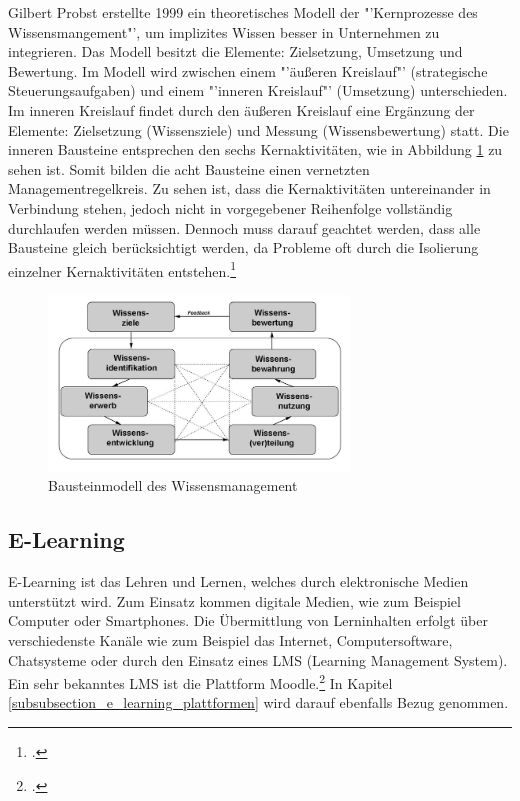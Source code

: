 Gilbert Probst erstellte 1999 ein theoretisches Modell der "'Kernprozesse des Wissensmangement"', um implizites 
Wissen besser in Unternehmen zu integrieren. Das Modell besitzt die Elemente: Zielsetzung, Umsetzung und 
Bewertung. Im Modell wird zwischen einem "'äußeren Kreislauf"' (strategische Steuerungsaufgaben) und einem 
"'inneren Kreislauf"' (Umsetzung) unterschieden. Im inneren Kreislauf findet durch den äußeren Kreislauf eine 
Ergänzung der Elemente: Zielsetzung (Wissensziele) und Messung (Wissensbewertung) statt. Die inneren Bausteine 
entsprechen den sechs Kernaktivitäten, wie in Abbildung \ref{fig_wissensmanagament_probst} zu sehen ist. Somit 
bilden die acht Bausteine einen vernetzten Managementregelkreis. Zu sehen ist, dass die Kernaktivitäten untereinander 
in Verbindung stehen, jedoch nicht in vorgegebener Reihenfolge vollständig durchlaufen werden müssen. Dennoch 
muss darauf geachtet werden, dass alle Bausteine gleich berücksichtigt werden, da Probleme oft durch die Isolierung 
einzelner Kernaktivitäten entstehen.\footcite[Vgl.][]{wissensmangement_enzyklopaedie-der-wirtschaftsinformatik.de_2012} 

\begin{figure}[h!]
	\centering
	\includegraphics[width=8cm]{kapitel/gruppe2/bilder/wissensmanagament_probst}
	\caption{Bausteinmodell des Wissensmanagement\protect\footnotemark}
	\label{fig_wissensmanagament_probst}
\end{figure}

\subsection{E-Learning}
\label{subsection_e-learning}
E-Learning ist das Lehren und Lernen, welches durch elektronische Medien unterstützt wird. Zum Einsatz kommen digitale Medien, wie zum Beispiel Computer oder Smartphones. Die Übermittlung von Lerninhalten erfolgt über verschiedenste Kanäle wie zum Beispiel das Internet, Computersoftware, Chatsysteme oder durch den Einsatz eines LMS (Learning Management System). Ein sehr bekanntes LMS ist die Plattform Moodle.\footcite[Vgl.][]{e-learning_team025.jimdo.com_2009} In Kapitel \ref{subsubsection_e_learning_plattformen} wird darauf ebenfalls Bezug genommen.

